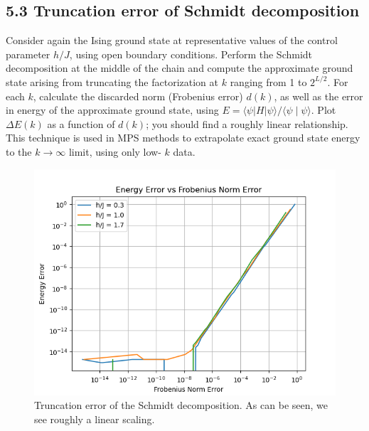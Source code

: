 \documentclass[12pt]{article}
\begin{document}
\subsection*{5.3 Truncation error of Schmidt decomposition}
Consider again the Ising ground state at representative values of the control parameter $h / J$, using open boundary conditions. Perform the Schmidt decomposition at the middle of the chain and compute the approximate ground state arising from truncating the factorization at $k$ ranging from 1 to $2^{L / 2}$. For each $k$, calculate the discarded norm (Frobenius error) $d(k)$, as well as the error in energy of the approximate ground state, using $E=\langle\psi|H| \psi\rangle /\langle\psi \mid \psi\rangle$. Plot $\Delta E(k)$ as a function of $d(k)$; you should find a roughly linear relationship. This technique is used in MPS methods to extrapolate exact ground state energy to the $k \rightarrow \infty$ limit, using only low- $k$ data.
\begin{figure}
\centering
\includegraphics[width=\textwidth]{energy_vs_frobenius_log_log.png}
\caption{Truncation error of the Schmidt decomposition. As can be seen, we see roughly a linear scaling.}
\end{figure}
\end{document}
